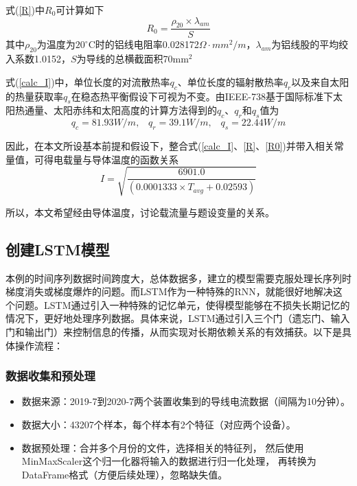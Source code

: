 \documentclass[withoutpreface,bwprint]{cumcmthesis}  %
\begin{document}
        式(\ref{R})中$R_{0}$可计算如下
        \begin{equation}
            R_0=\frac{\rho _{20}\times \lambda _{am}}{S}
            \label{R0}
        \end{equation}
        其中$\rho _{20}$为温度为$20^\circ$C时的铝线电阻率0.028172$\varOmega \cdot mm^2/m$，$\lambda _{am}$为铝线股的平均绞入系数1.0152，$S$为导线的总横截面积70mm$^{2}$

        式(\ref{calc_I})中，单位长度的对流散热率$q_{c}$、单位长度的辐射散热率$q_{r}$以及来自太阳的热量获取率$q_{s}$在稳态热平衡假设下可视为不变。由IEEE-738基于国际标准下太阳热通量、太阳赤纬和太阳高度的计算方法得到的$q_{c}$、$q_{r}$和$q_{s}$值为
        \[q_{c}=81.93 W/m,\;\;\;q_{r}=39.1 W/m,\;\;\;q_{s}=22.44 W/m \]

        因此，在本文所设基本前提和假设下，整合式(\ref{calc_I}、\ref{R}、\ref{R0})并带入相关常量值，可得电载量与导体温度的函数关系
        \begin{equation}
            I=\sqrt{\frac{6901.0}{(0.0001333\times T_{avg} + 0.02593)}}
            \label{I}
        \end{equation}

        所以，本文希望经由导体温度，讨论载流量与题设变量的关系。
        
        
	\subsection {创建LSTM模型}

        本例的时间序列数据时间跨度大，总体数据多，建立的模型需要克服处理长序列时梯度消失或梯度爆炸的问题。而LSTM作为一种特殊的RNN，就能很好地解决这个问题。LSTM通过引入一种特殊的记忆单元，使得模型能够在不损失长期记忆的情况下，更好地处理序列数据。具体来说，LSTM通过引入三个门（遗忘门、输入门和输出门）来控制信息的传播，从而实现对长期依赖关系的有效捕获。以下是具体操作流程：  

        \subsubsection{数据收集和预处理}
                \begin{itemize}
                    \item 数据来源：2019-7到2020-7两个装置收集到的导线电流数据（间隔为10分钟）。
                    \item 数据大小：43207个样本，每个样本有2个特征（对应两个设备）。
                    \item 数据预处理：合并多个月份的文件，选择相关的特征列，
                          然后使用MinMaxScaler这个归一化器将输入的数据进行归一化处理，
                          再转换为DataFrame格式（方便后续处理），忽略缺失值。
                \end{itemize}
                
\end{document}
